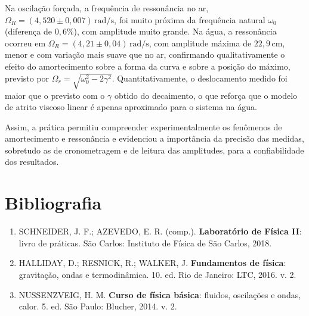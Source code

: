 \documentclass[12pt, a4paper]{article}
\newcommand{\un}[1]{\,\mathrm{#1}}
\begin{document}
Na oscilação forçada, a frequência de ressonância no ar, $\Omega_R=(4{,}520\pm0{,}007)\un{rad/s}$, foi muito próxima da frequência natural $\omega_0$ (diferença de $0{,}6\%$), com amplitude muito grande. Na água, a ressonância ocorreu em $\Omega_R=(4{,}21\pm0{,}04)\un{rad/s}$, com amplitude máxima de $22{,}9\un{cm}$, menor e com variação mais suave que no ar, confirmando qualitativamente o efeito do amortecimento sobre a forma da curva e sobre a posição do máximo, previsto por $\Omega_r=\sqrt{\omega_0^2-2\gamma^2}$. Quantitativamente, o deslocamento medido foi maior que o previsto com o $\gamma$ obtido do decaimento, o que reforça que o modelo de atrito viscoso linear é apenas aproximado para o sistema na água.

Assim, a prática permitiu compreender experimentalmente os fenômenos de amortecimento e ressonância e evidenciou a importância da precisão das medidas, sobretudo as de cronometragem e de leitura das amplitudes, para a confiabilidade dos resultados.

\section{Bibliografia}

\begin{enumerate}
    \item SCHNEIDER, J. F.; AZEVEDO, E. R. (comp.). \textbf{Laboratório de Física II}: livro de práticas. São Carlos: Instituto de Física de São Carlos, 2018.
    \item HALLIDAY, D.; RESNICK, R.; WALKER, J. \textbf{Fundamentos de física}: gravitação, ondas e termodinâmica. 10. ed. Rio de Janeiro: LTC, 2016. v. 2.
    \item NUSSENZVEIG, H. M. \textbf{Curso de física básica}: fluidos, oscilações e ondas, calor. 5. ed. São Paulo: Blucher, 2014. v. 2.
\end{enumerate}
\end{document}
